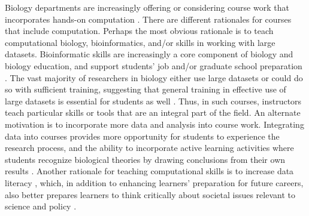 
Biology departments are increasingly offering or considering course work that incorporates hands-on computation
\citep{WilsonSayres18}. 
There are different rationales for courses that include computation.
Perhaps the most obvious rationale is to teach computational biology, bioinformatics,
and/or skills in working with large datasets.
Bioinformatic skills are increasingly a core component of biology and biology education, and 
support students' job and/or graduate school preparation \citep{WilsonSayres18}. 
The vast majority of researchers in biology either use large datasets or could do so with sufficient training, suggesting that general training in effective use of large datasets is essential for students as well \citep{Barone17,Loman13}.
Thus, in such courses, instructors teach particular skills or tools that are an integral part of the field.
An alternate motivation is to incorporate more data and analysis into course work.
Integrating data into courses provides more opportunity for students to experience the research process, and the ability to incorporate active learning activities where
students recognize biological theories by drawing conclusions from their own results
\citep{Kjelvik19}.
Another rationale for teaching computational skills is to increase data literacy \citep{Gibson18}, which, in addition to enhancing learners' preparation for future careers, also better prepares learners to think critically about societal issues relevant to science and policy \citep{cook2014}.

